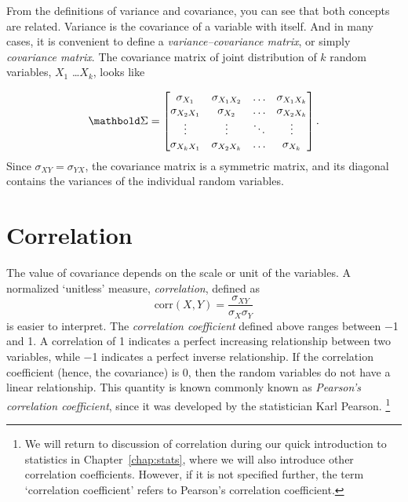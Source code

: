 From the definitions of variance and covariance,
you can see that both concepts are related.
Variance is the covariance of a variable with itself.%
And in many cases,
it is convenient to define a \emph{variance--covariance matrix},
or simply \emph{covariance matrix}.
The covariance matrix of joint distribution of $k$ random variables,
$X_{1}$ \ldots $X_{k}$, looks like

\[
  \vect{\Sigma} =
  \begin{bmatrix}
    \sigma_{X_{1}} & \sigma_{X_{1}X_{2}} & \ldots & \sigma_{X_{1}X_{k}} \\ 
    \sigma_{X_{2}X_{1}} & \sigma_{X_{2}} & \ldots & \sigma_{X_{2}X_{k}} \\ 
    \vdots & \vdots & \ddots & \vdots \\ 
    \sigma_{X_{k}X_{1}} & \sigma_{X_{2}X_{k}} & \ldots & \sigma_{X_{k}} \\ 
  \end{bmatrix} .
\]
Since $\sigma_{XY} = \sigma_{YX}$,
the covariance matrix is a symmetric matrix,
and its diagonal contains the variances of the individual random variables.



%

\section{Correlation}

The value of covariance depends
on the scale or unit of the variables.
A normalized `unitless' measure, \emph{correlation}, defined as
\begin{equation}
  \text{corr}(X, Y) = \frac{\sigma_{XY}}{\sigma_{X}\sigma_{Y}}
\end{equation}
is easier to interpret.
The \emph{correlation coefficient} defined above ranges between \num{-1} and \num{+1}.
A correlation of \num{+1} indicates a perfect increasing relationship between two variables,
while \num{-1} indicates a perfect inverse relationship.
If the correlation coefficient (hence, the covariance) is \num{0}, 
then the random variables do not have a linear relationship.
This quantity is known commonly known as
\emph{Pearson's correlation coefficient},
since it was developed by the statistician Karl Pearson.%
\footnote{%
  We will return to discussion of correlation
  during our quick introduction to statistics in Chapter~\ref{chap:stats},
  where we will also introduce other correlation coefficients.
  However, if it is not specified further,
  the term `correlation coefficient' refers to Pearson's correlation coefficient.
}

